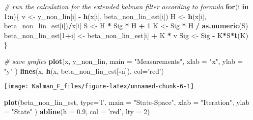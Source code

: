 \documentclass[
]{article}
\newenvironment{Shaded}{\begin{snugshade}}{\end{snugshade}}
\newcommand{\CommentTok}[1]{\textcolor[rgb]{0.56,0.35,0.01}{\textit{#1}}}
\newcommand{\ControlFlowTok}[1]{\textcolor[rgb]{0.13,0.29,0.53}{\textbf{#1}}}
\newcommand{\DataTypeTok}[1]{\textcolor[rgb]{0.13,0.29,0.53}{#1}}
\newcommand{\DecValTok}[1]{\textcolor[rgb]{0.00,0.00,0.81}{#1}}
\newcommand{\FloatTok}[1]{\textcolor[rgb]{0.00,0.00,0.81}{#1}}
\newcommand{\KeywordTok}[1]{\textcolor[rgb]{0.13,0.29,0.53}{\textbf{#1}}}
\newcommand{\NormalTok}[1]{#1}
\newcommand{\OperatorTok}[1]{\textcolor[rgb]{0.81,0.36,0.00}{\textbf{#1}}}
\newcommand{\StringTok}[1]{\textcolor[rgb]{0.31,0.60,0.02}{#1}}
\begin{document}
\begin{Shaded}
\begin{Highlighting}[]
\CommentTok{# run the calculation for the extended kalman filter according to formula}
\ControlFlowTok{for}\NormalTok{(i }\ControlFlowTok{in} \DecValTok{1}\OperatorTok{:}\NormalTok{n)\{}
\NormalTok{    v  <-}\StringTok{ }\NormalTok{y_non_lin[i] }\OperatorTok{-}\StringTok{ }\KeywordTok{h}\NormalTok{(x[i], beta_non_lin_est[i])}
\NormalTok{    H <-}\StringTok{ }\KeywordTok{h}\NormalTok{(x[i], beta_non_lin_est[i])}\OperatorTok{/}\NormalTok{x[i]}
\NormalTok{    S  <-}\StringTok{ }\NormalTok{H }\OperatorTok{*}\StringTok{ }\NormalTok{Sig }\OperatorTok{*}\StringTok{ }\NormalTok{H }\OperatorTok{+}\StringTok{ }\DecValTok{1}
\NormalTok{    K  <-}\StringTok{ }\NormalTok{Sig }\OperatorTok{*}\StringTok{ }\NormalTok{H }\OperatorTok{/}\StringTok{ }\KeywordTok{as.numeric}\NormalTok{(S)}
\NormalTok{    beta_non_lin_est[}\DecValTok{1}\OperatorTok{+}\NormalTok{i]  <-}\StringTok{ }\NormalTok{beta_non_lin_est[i] }\OperatorTok{+}\StringTok{ }\NormalTok{K }\OperatorTok{*}\StringTok{ }\NormalTok{v}
\NormalTok{    Sig <-}\StringTok{ }\NormalTok{Sig }\OperatorTok{-}\StringTok{ }\NormalTok{K}\OperatorTok{*}\NormalTok{S}\OperatorTok{*}\KeywordTok{t}\NormalTok{(K)}
\NormalTok{\}}

\CommentTok{# save grafics}
\KeywordTok{plot}\NormalTok{(x, y_non_lin, }
    \DataTypeTok{main =} \StringTok{"Measurements"}\NormalTok{,}
    \DataTypeTok{xlab =} \StringTok{"x"}\NormalTok{,}
    \DataTypeTok{ylab =} \StringTok{"y"}
\NormalTok{)}
\KeywordTok{lines}\NormalTok{(x, }\KeywordTok{h}\NormalTok{(x, beta_non_lin_est[}\OperatorTok{-}\NormalTok{n]), }\DataTypeTok{col=}\StringTok{'red'}\NormalTok{)}
\end{Highlighting}
\end{Shaded}

\begin{center}\texttt{[image: Kalman\_F\_files/figure-latex/unnamed-chunk-6-1]} \end{center}

\begin{Shaded}
\begin{Highlighting}[]
\KeywordTok{plot}\NormalTok{(beta_non_lin_est, }\DataTypeTok{type=}\StringTok{'l'}\NormalTok{,}
 \DataTypeTok{main =} \StringTok{"State-Space"}\NormalTok{,}
 \DataTypeTok{xlab =} \StringTok{"Iteration"}\NormalTok{,}
 \DataTypeTok{ylab =} \StringTok{"State"}
\NormalTok{)}
\KeywordTok{abline}\NormalTok{(}\DataTypeTok{h =} \FloatTok{0.9}\NormalTok{, }\DataTypeTok{col =} \StringTok{'red'}\NormalTok{, }\DataTypeTok{lty =} \DecValTok{2}\NormalTok{)}
\end{Highlighting}
\end{Shaded}
\end{document}
